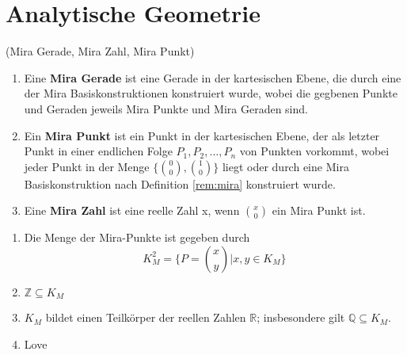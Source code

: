 \chapter{Analytische Geometrie}

\begin{definition} 
    (Mira Gerade, Mira Zahl, Mira Punkt)
    \begin{enumerate}
        \item Eine \textbf{Mira Gerade} ist eine Gerade in der kartesischen Ebene, die durch eine der Mira Basiskonstruktionen konstruiert wurde, wobei die gegbenen Punkte und Geraden jeweils Mira Punkte und Mira Geraden sind.
        \item Ein \textbf{Mira Punkt} ist ein Punkt in der kartesischen Ebene, der als letzter Punkt in einer endlichen Folge $P_1,P_2, \dots, P_n$ von Punkten vorkommt, wobei jeder Punkt in der Menge $ \{ \binom{0}{0}, \binom{1}{0} \} $ liegt oder durch eine Mira Basiskonstruktion nach Definition \ref{rem:mira} konstruiert wurde.
        \item Eine \textbf{Mira Zahl} ist eine reelle Zahl x, wenn $ \binom{x}{0} $ ein Mira Punkt ist.
    \end{enumerate}
\end{definition}

\begin{proposition}
    \begin{enumerate}[label=(\alph*)]
        \item Die Menge der Mira-Punkte ist gegeben durch
        $$K_M^2 = \{P=\binom{x}{y} \vert x,y \in K_M\}$$
        \item $\mathbb{Z} \subseteq K_M$
        \item $K_M$ bildet einen Teilkörper der reellen Zahlen $\mathbb{R}$; insbesondere gilt $\mathbb{Q} \subseteq K_M$.
        \item Love
    \end{enumerate}
\end{proposition}

